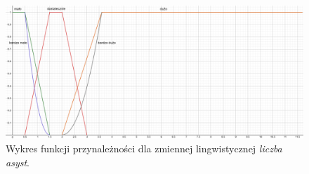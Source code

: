 \documentclass{classrep}
\begin{document}
\begin{enumerate}
    \begin{figure}[H]
        \centering
        \includegraphics[width=14cm]{wykres_asysty.png}
        \caption{Wykres funkcji przynależności dla zmiennej lingwistycznej \textit{liczba asyst}.}
        \label{rysunek:asysty}
    \end{figure}
    

\end{enumerate}
\end{document}

